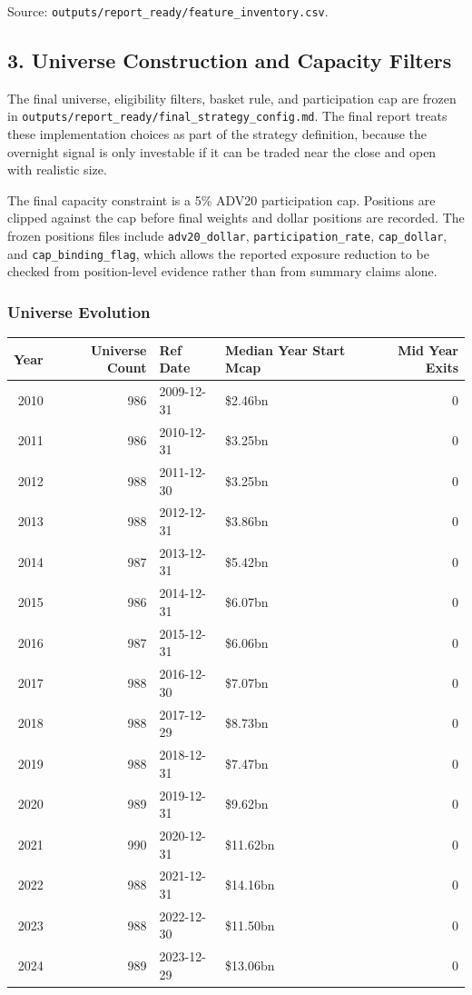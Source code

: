 \documentclass[
]{article}
\begin{document}
Source: \texttt{outputs/report\_ready/feature\_inventory.csv}.

\hypertarget{3-universe-construction-and-capacity-filters}{%
\subsection{3. Universe Construction and Capacity
Filters}\label{3-universe-construction-and-capacity-filters}}

The final universe, eligibility filters, basket rule, and participation
cap are frozen in
\texttt{outputs/report\_ready/final\_strategy\_config.md}. The final
report treats these implementation choices as part of the strategy
definition, because the overnight signal is only investable if it can be
traded near the close and open with realistic size.

The final capacity constraint is a 5\% ADV20 participation cap.
Positions are clipped against the cap before final weights and dollar
positions are recorded. The frozen positions files include
\texttt{adv20\_dollar}, \texttt{participation\_rate},
\texttt{cap\_dollar}, and \texttt{cap\_binding\_flag}, which allows the
reported exposure reduction to be checked from position-level evidence
rather than from summary claims alone.

\hypertarget{universe-evolution}{%
\subsubsection{Universe Evolution}\label{universe-evolution}}

\begin{longtable}[]{@{}rrllr@{}}
\toprule
Year & Universe Count & Ref Date & Median Year Start Mcap & Mid Year
Exits \\
\midrule
\endhead
2010 & 986 & 2009-12-31 & \$2.46bn & 0 \\
2011 & 986 & 2010-12-31 & \$3.25bn & 0 \\
2012 & 988 & 2011-12-30 & \$3.25bn & 0 \\
2013 & 988 & 2012-12-31 & \$3.86bn & 0 \\
2014 & 987 & 2013-12-31 & \$5.42bn & 0 \\
2015 & 986 & 2014-12-31 & \$6.07bn & 0 \\
2016 & 987 & 2015-12-31 & \$6.06bn & 0 \\
2017 & 988 & 2016-12-30 & \$7.07bn & 0 \\
2018 & 988 & 2017-12-29 & \$8.73bn & 0 \\
2019 & 988 & 2018-12-31 & \$7.47bn & 0 \\
2020 & 989 & 2019-12-31 & \$9.62bn & 0 \\
2021 & 990 & 2020-12-31 & \$11.62bn & 0 \\
2022 & 988 & 2021-12-31 & \$14.16bn & 0 \\
2023 & 988 & 2022-12-30 & \$11.50bn & 0 \\
2024 & 989 & 2023-12-29 & \$13.06bn & 0 \\
\bottomrule
\end{longtable}
\end{document}
